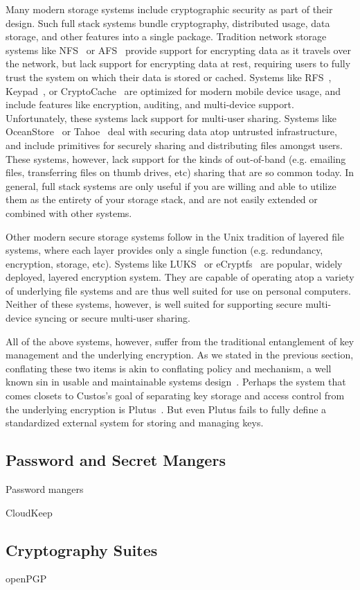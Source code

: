 Many modern storage systems include cryptographic security as part of
their design. Such full stack systems bundle cryptography, distributed
usage, data storage, and other features into a single
package. Tradition network storage systems like
NFS~\cite{Sandberg1985} or AFS~\cite{Howard1988} provide support for
encrypting data as it travels over the network, but lack support for
encrypting data at rest, requiring users to fully trust the system on
which their data is stored or cached. Systems like
RFS~\cite{Dong2011}, Keypad~\cite{Geambasu2011}, or
CryptoCache~\cite{Jensen2000} are optimized for modern mobile device
usage, and include features like encryption, auditing, and
multi-device support. Unfortunately, these systems lack support for
multi-user sharing. Systems like OceanStore~\cite{Kubiatowicz2000} or
Tahoe~\cite{Wilcox-O'Hearn2008} deal with securing data atop untrusted
infrastructure, and include primitives for securely sharing and
distributing files amongst users. These systems, however, lack support
for the kinds of out-of-band (e.g. emailing files, transferring files
on thumb drives, etc) sharing that are so common today. In general,
full stack systems are only useful if you are willing and able to
utilize them as the entirety of your storage stack, and are not easily
extended or combined with other systems.

Other modern secure storage systems follow in the Unix tradition of
layered file systems, where each layer provides only a single function
(e.g. redundancy, encryption, storage, etc). Systems like
LUKS~\cite{luks} or eCryptfs~\cite{eCryptfs, Halcrow} are popular,
widely deployed, layered encryption system. They are capable of
operating atop a variety of underlying file systems and are thus well
suited for use on personal computers. Neither of these systems,
however, is well suited for supporting secure multi-device syncing or
secure multi-user sharing.

All of the above systems, however, suffer from the traditional
entanglement of key management and the underlying encryption. As we
stated in the previous section, conflating these two items is akin to
conflating policy and mechanism, a well known sin in usable and
maintainable systems design~\cite{Wulf1974}. Perhaps the system that
comes closets to Custos's goal of separating key storage and access
control from the underlying encryption is
Plutus~\cite{Kallahalla2003}. But even Plutus fails to fully define a
standardized external system for storing and managing keys.

\subsection{Password and Secret Mangers}

Password mangers

CloudKeep~\cite{cloudkeep-presentation}

\subsection{Cryptography Suites}

openPGP
